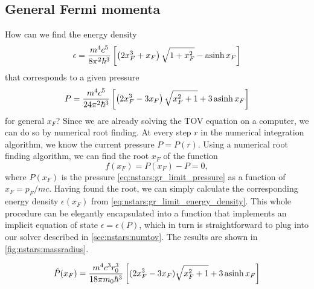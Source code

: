 
\iffalse
Dimensionless equation of state
\begin{equation}
	\diml{\epsilon} = \left[ \frac{4^2 5^3}{3^4 \pi^2} \frac{m^8 c^6 r_0^6}{m_0^2 \hbar^6} \diml{P}^3 \right]^{\frac{1}{5}}
\end{equation}
\fi

\subsection{General Fermi momenta}
\label{sec:nstars:gr_limit}

How can we find the energy density
\begin{equation}
	\epsilon = \frac{m^4 c^5}{8 \pi^2 \hbar^3} \left[ \left( 2 x_F^3 + x_F \right) \sqrt{1 + x_F^2} - \operatorname{asinh} x_F \right]
\label{eq:nstars:gr_limit_energy_density}
\end{equation}
that corresponds to a given pressure
\begin{equation}
	P = \frac{m^4 c^5}{24 \pi^2 \hbar^3} \left[ \left( 2 x_F^3 - 3 x_F \right) \sqrt{x_F^2 + 1} + 3 \operatorname{asinh} x_F \right] 
\label{eq:nstars:gr_limit_pressure}
\end{equation}
for general $x_F$?
Since we are already solving the TOV equation on a computer, we can do so by numerical root finding.
At every step $r$ in the numerical integration algorithm, we know the current pressure $P = P(r)$.
Using a numerical root finding algorithm, we can find the root $x_F$ of the function
\begin{equation}
	f(x_F) = P(x_F) - P = 0,
\end{equation}
where $P(x_F)$ is the pressure \eqref{eq:nstars:gr_limit_pressure} as a function of $x_F = p_F / m c$.
Having found the root, we can simply calculate the corresponding energy density $\epsilon(x_F)$ from \cref{eq:nstars:gr_limit_energy_density}.
This whole procedure can be elegantly encapsulated into a function that implements an implicit equation of state $\epsilon = \epsilon(P)$, which in turn is straightforward to plug into our solver described in \cref{sec:nstars:numtov}.
The results are shown in \cref{fig:nstars:massradius}.

\iffalse
\begin{equation}
	\hat{P}(x_F) = \frac{m^4 c^3 r_0^3}{18 \pi m_0 \hbar^3} \left[ (2 x_F^3 - 3 x_F) \sqrt{x_F^2 + 1} + 3 \operatorname{asinh} x_F \right]
\end{equation}

